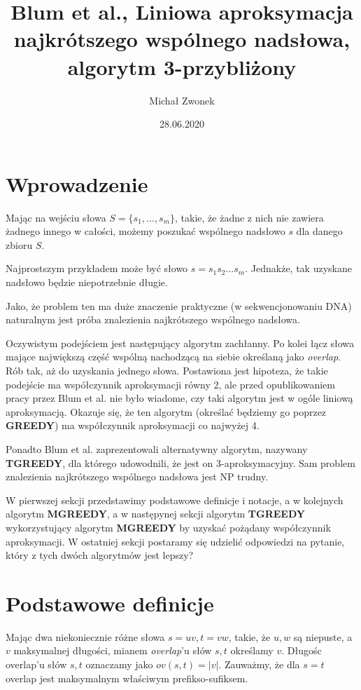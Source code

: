 \documentclass[12pt]{article}
\title{Blum et al., Liniowa aproksymacja najkrótszego wspólnego nadsłowa, algorytm 3-przybliżony}
\author{Michał Zwonek}
\date{28.06.2020}
\theoremstyle{definition}
\begin{document}
\maketitle

\section*{Wprowadzenie}

Mając na wejściu słowa $S = \{s_1,...,s_m\}$, takie, że żadne z nich nie zawiera żadnego innego w całości, możemy poszukać wspólnego nadsłowo $s$ dla danego zbioru $S$.

Najprostszym przykładem może być słowo $s=s_1s_2...s_m$. Jednakże, tak uzyskane nadsłowo będzie niepotrzebnie długie.

Jako, że problem ten ma duże znaczenie praktyczne (w sekwencjonowaniu DNA) naturalnym jest próba znalezienia najkrótszego wspólnego nadsłowa.

Oczywistym podejściem jest następujący algorytm zachłanny. Po kolei łącz słowa mające największą część wspólną nachodzącą na siebie określaną jako \textit{overlap}. Rób tak, aż do uzyskania 
jednego słowa. Postawiona jest hipoteza, że takie podejście ma współczynnik aproksymacji równy 2, ale przed opublikowaniem pracy przez Blum et al. nie było wiadome, czy taki algorytm jest w ogóle liniową aproksymacją. Okazuje się, że ten algorytm (określać będziemy go poprzez \textbf{GREEDY}) ma współczynnik aproksymacji co najwyżej 4.

Ponadto Blum et al. zaprezentowali alternatywny algorytm, nazywany \textbf{TGREEDY}, dla którego udowodnili, że jest on 3-aproksymacyjny. Sam problem znalezienia najkrótszego wspólnego nadsłowa jest NP trudny.

W pierwszej sekcji przedstawimy podstawowe definicje i notacje, a w kolejnych algorytm \textbf{MGREEDY}, a w następynej sekcji algorytm 
\textbf{TGREEDY} wykorzystujący algorytm \textbf{MGREEDY} by uzyskać pożądany współczynnik aproksymacji. W ostatniej sekcji postaramy się udzielić odpowiedzi na pytanie, który z tych dwóch algorytmów jest lepszy? \pagebreak
\section*{Podstawowe definicje}

Mając dwa niekoniecznie różne słowa $s = uv, t = vw$, takie, że $u,w$ są niepuste, a $v$ maksymalnej długości, mianem \textit{overlap}'u słów $s,t$ określamy $v$.
Długośc overlap'u słów $s,t$ oznaczamy jako $ov(s,t) = |v|$. Zauważmy, że dla $s=t$ overlap jest maksymalnym właściwym prefikso-sufiksem. 
\end{document}
